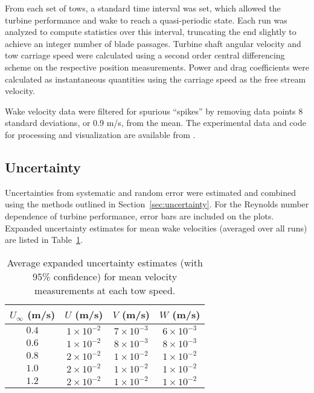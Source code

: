 From each set of tows, a standard time interval was set, which allowed the
turbine performance and wake to reach a quasi-periodic state. Each run was
analyzed to compute statistics over this interval, truncating the end slightly
to achieve an integer number of blade passages. Turbine shaft angular velocity
and tow carriage speed were calculated using a second order central differencing
scheme on the respective position measurements. Power and drag coefficients were
calculated as instantaneous quantities using the carriage speed as the free
stream velocity.

Wake velocity data were filtered for spurious ``spikes'' by removing data points
8 standard deviations, or 0.9 m/s, from the mean. The experimental data and code
for processing and visualization are available from
\cite{Bachant2016-RVAT-Re-dep}.


\subsection{Uncertainty}

Uncertainties from systematic and random error were estimated and combined using
the methods outlined in Section~\ref{sec:uncertainty}. For the Reynolds number
dependence of turbine performance, error bars are included on the plots.
Expanded uncertainty estimates for mean wake velocities (averaged over all runs)
are listed in Table~\ref{tab:vel-unc}.

\begin{table}[ht]
\centering
\begin{tabular}{c|c|c|c}
    $U_\infty$ (m/s) &   $U$ (m/s) &  $V$ (m/s) &  $W$ (m/s) \\
    \hline
    $0.4$ & $1 \times 10^{-2}$ & $7 \times 10^{-3}$ & $6 \times 10^{-3}$ \\
    $0.6$ & $1 \times 10^{-2}$ & $8 \times 10^{-3}$ & $8 \times 10^{-3}$ \\
    $0.8$ & $2 \times 10^{-2}$ & $1 \times 10^{-2}$ & $1 \times 10^{-2}$ \\
    $1.0$ & $2 \times 10^{-2}$ & $1 \times 10^{-2}$ & $1 \times 10^{-2}$ \\
    $1.2$ & $2 \times 10^{-2}$ & $1 \times 10^{-2}$ & $1 \times 10^{-2}$ \\
\end{tabular}
\caption{Average expanded uncertainty estimates (with 95\% confidence) for mean
    velocity measurements at each tow speed.}

\label{tab:vel-unc}
\end{table}


